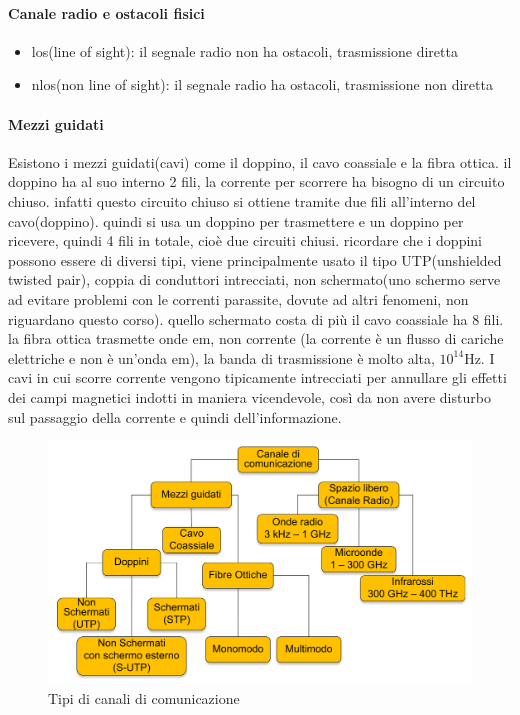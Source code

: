 \paragraph{Canale radio e ostacoli fisici}
\begin{itemize}
    \item los(line of sight): il segnale radio non ha ostacoli, trasmissione diretta
    \item nlos(non line of sight): il segnale radio ha ostacoli, trasmissione non diretta
\end{itemize}
\paragraph{Mezzi guidati}
Esistono i mezzi guidati(cavi) come il doppino, il cavo coassiale e la fibra ottica.
il doppino ha al suo interno 2 fili, la corrente per scorrere ha bisogno di un circuito chiuso. infatti questo circuito chiuso si ottiene tramite due fili all’interno del cavo(doppino).
quindi si usa un doppino per trasmettere e un doppino per ricevere, quindi 4 fili in totale, cioè due circuiti chiusi. ricordare che i doppini possono essere di diversi tipi, viene principalmente usato il tipo UTP(unshielded twisted pair), coppia di conduttori intrecciati, non schermato(uno schermo serve ad evitare problemi con le correnti parassite, dovute ad altri fenomeni, non riguardano questo corso). quello schermato costa di più
il cavo coassiale ha 8 fili.
la fibra ottica trasmette onde em, non corrente (la corrente è un flusso di cariche elettriche e non è un'onda em), la banda di trasmissione è molto alta, $10^{14}$Hz.
I cavi in cui scorre corrente vengono tipicamente intrecciati per annullare gli effetti dei campi magnetici indotti in maniera vicendevole, così da non avere disturbo sul passaggio della corrente e quindi dell'informazione.
\begin{figure}[h!]
    \centering
    \includegraphics[width=1.05\textwidth]{images/canali_comunicazione}
    \caption{Tipi di canali di comunicazione}
    \label{fig:canali_comunicazione}
\end{figure}
\newpage

